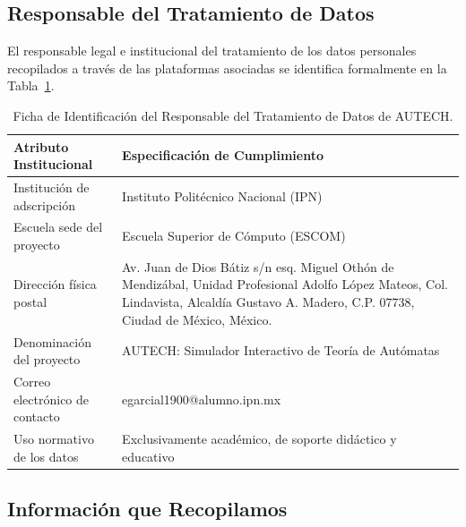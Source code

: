 \subsection{Responsable del Tratamiento de Datos}
\label{subsec:privacidad_responsable}

El responsable legal e institucional del tratamiento de los datos personales recopilados a través de las plataformas asociadas se identifica formalmente en la Tabla~\ref{tab:ficha_responsable}.

\begin{table}[htbp]
    \centering
    \small
    \caption{Ficha de Identificación del Responsable del Tratamiento de Datos de AUTECH.}
    \label{tab:ficha_responsable}
    \begin{tabular}{l p{10.5cm}}
        \toprule
        \textbf{Atributo Institucional} & \textbf{Especificación de Cumplimiento} \\
        \midrule
        Institución de adscripción & Instituto Politécnico Nacional (IPN) \\
        Escuela sede del proyecto & Escuela Superior de Cómputo (ESCOM) \\
        Dirección física postal & Av. Juan de Dios Bátiz s/n esq. Miguel Othón de Mendizábal, Unidad Profesional Adolfo López Mateos, Col. Lindavista, Alcaldía Gustavo A. Madero, C.P. 07738, Ciudad de México, México. \\
        Denominación del proyecto & AUTECH: Simulador Interactivo de Teoría de Autómatas \\
        Correo electrónico de contacto & egarcial1900@alumno.ipn.mx \\
        Uso normativo de los datos & Exclusivamente académico, de soporte didáctico y educativo \\
        \bottomrule
    \end{tabular}
\end{table}

\subsection{Información que Recopilamos}
\label{subsec:privacidad_recopilacion}

